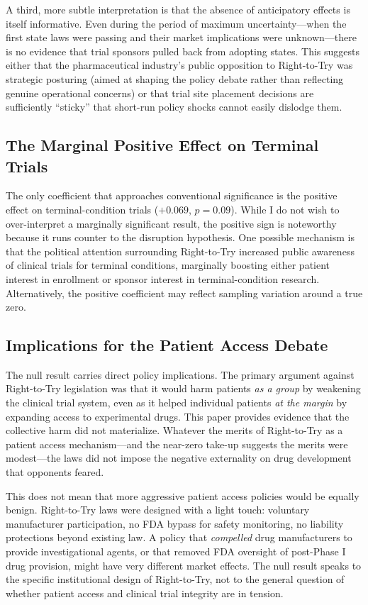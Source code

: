 \documentclass[12pt]{article}
\begin{document}
A third, more subtle interpretation is that the absence of anticipatory effects is itself informative. Even during the period of maximum uncertainty---when the first state laws were passing and their market implications were unknown---there is no evidence that trial sponsors pulled back from adopting states. This suggests either that the pharmaceutical industry's public opposition to Right-to-Try was strategic posturing (aimed at shaping the policy debate rather than reflecting genuine operational concerns) or that trial site placement decisions are sufficiently ``sticky'' that short-run policy shocks cannot easily dislodge them.

\subsection{The Marginal Positive Effect on Terminal Trials}

The only coefficient that approaches conventional significance is the positive effect on terminal-condition trials ($+0.069$, $p = 0.09$). While I do not wish to over-interpret a marginally significant result, the positive sign is noteworthy because it runs counter to the disruption hypothesis. One possible mechanism is that the political attention surrounding Right-to-Try increased public awareness of clinical trials for terminal conditions, marginally boosting either patient interest in enrollment or sponsor interest in terminal-condition research. Alternatively, the positive coefficient may reflect sampling variation around a true zero.

\subsection{Implications for the Patient Access Debate}

The null result carries direct policy implications. The primary argument against Right-to-Try legislation was that it would harm patients \textit{as a group} by weakening the clinical trial system, even as it helped individual patients \textit{at the margin} by expanding access to experimental drugs. This paper provides evidence that the collective harm did not materialize. Whatever the merits of Right-to-Try as a patient access mechanism---and the near-zero take-up suggests the merits were modest---the laws did not impose the negative externality on drug development that opponents feared.

This does not mean that more aggressive patient access policies would be equally benign. Right-to-Try laws were designed with a light touch: voluntary manufacturer participation, no FDA bypass for safety monitoring, no liability protections beyond existing law. A policy that \textit{compelled} drug manufacturers to provide investigational agents, or that removed FDA oversight of post-Phase I drug provision, might have very different market effects. The null result speaks to the specific institutional design of Right-to-Try, not to the general question of whether patient access and clinical trial integrity are in tension.
\end{document}
